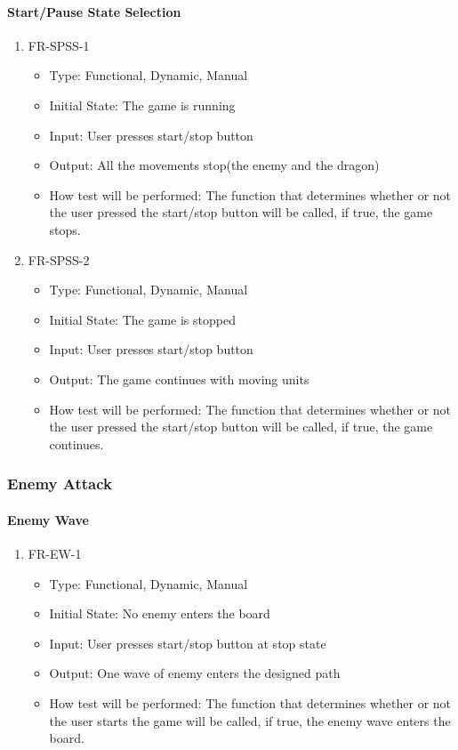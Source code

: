 \documentclass[12,english]{article}
\begin{document}
\paragraph{Start/Pause State Selection}
\begin{enumerate}
  \item FR-SPSS-1
  \begin{itemize}
      \item Type: Functional, Dynamic, Manual
      \item Initial State: The game is running
      \item Input: User presses start/stop button
      \item Output: All the movements stop(the enemy and the dragon)
      \item How test will be performed: The function that determines whether or not the user pressed the start/stop button will be called, if true,  the game stops.
  \end{itemize}
  \item FR-SPSS-2
  \begin{itemize}
      \item Type: Functional, Dynamic, Manual
      \item Initial State:  The game is stopped
      \item Input: User presses start/stop button
      \item Output: The game continues with moving units
      \item How test will be performed: The function that determines whether or not the user pressed the start/stop button will be called, if true,  the game continues.
  \end{itemize}
\end{enumerate}

\subsubsection{Enemy Attack}
\paragraph{Enemy Wave}
\begin{enumerate}
  \item FR-EW-1
  \begin{itemize}
      \item Type: Functional, Dynamic, Manual
      \item Initial State: No enemy enters the board
      \item Input: User presses start/stop button at stop state
      \item Output: One wave of enemy enters the designed path
      \item How test will be performed: The function that determines whether or not the user starts the game will be called, if true,  the enemy wave enters the board. 
  \end{itemize}
\end{enumerate}
\end{document}
